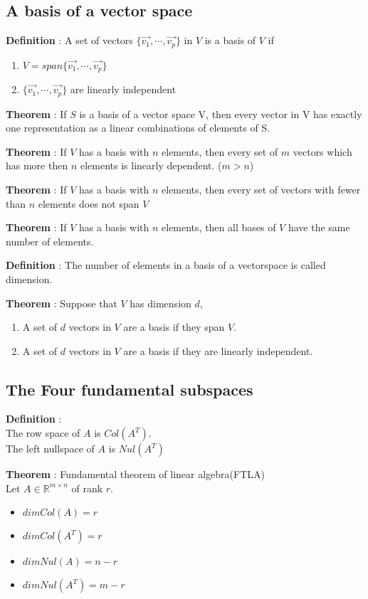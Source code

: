 \documentclass{article}
\begin{document}
\subsection{A basis of a vector space}
{
\textbf{Definition} : A set of vectors $\{\vec{v_1},\cdots,\vec{v_p}\}$ in $V$ is a basis of $V$ if
\begin{enumerate}
    \item $V = span\{\vec{v_1},\cdots,\vec{v_p}\}$ 
    \item $\{\vec{v_1},\cdots,\vec{v_p}\}$ are linearly independent
\end{enumerate}

\textbf{Theorem} : If $S$ is a basis of a vector space V, then every vector in V has exactly one representation as a linear combinations of elements of S.

\textbf{Theorem} : If $V$ has a basis with $n$ elements, then every set of $m$ vectors which has more then $n$ elements is linearly dependent. ($m>n$)

\textbf{Theorem} :  If $V$ has a basis with $n$ elements, then every set of vectors with fewer than $n$ elements does not span $V$

\textbf{Theorem} : If $V$ has a basis with $n$ elements, then all bases of $V$ have the same number of elements.

\textbf{Definition} : The number of elements in a basis of a vectorspace is called dimension.

\textbf{Theorem} : Suppose that $V$ has dimension $d$,
\begin{enumerate}
    \item A set of $d$ vectors in $V$ are a basis if they span $V$.
    \item A set of $d$ vectors in $V$ are a basis if they are linearly independent.
\end{enumerate}

}
\subsection{The Four fundamental subspaces}
{
\textbf{Definition} : \\The row space of $A$ is $Col(A^T)$.\\The left nullspace of $A$ is $Nul(A^T)$

\textbf{Theorem} : Fundamental theorem of linear algebra(FTLA)\\
Let $A \in \mathbb{R}^{m \times n}$ of rank $r$.
\begin{itemize}
    \item $dim Col(A) = r$
    \item $dim Col(A^T) = r$
    \item $dim Nul(A) = n-r$
    \item $dim Nul(A^T) = m-r$
\end{itemize}

}
\end{document}

